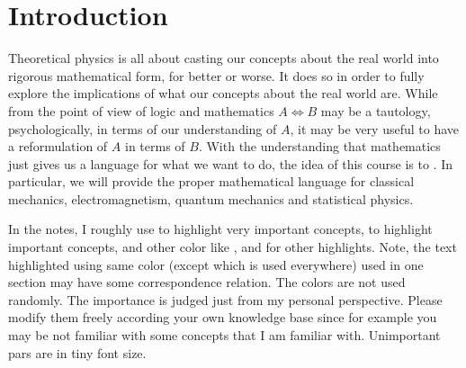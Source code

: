 \documentclass{article}
\begin{document}
\section{Introduction}
Theoretical physics is all about casting our concepts about the real world into rigorous mathematical form, for better or worse. 
It does so in order to fully explore the implications of what our concepts about the real world are. While from the point of view of logic and mathematics $A\Leftrightarrow B$ may be a tautology, psychologically, in terms of our understanding of $A$, it may be very useful to have a reformulation of $A$ in terms of $B$. With the understanding that mathematics just gives us a language for what we want to do, the idea of this course is to . In particular, we will provide the proper mathematical language for classical mechanics, electromagnetism, quantum mechanics and statistical physics.

In the notes,  I roughly use  to highlight very important concepts,  to highlight important concepts, and other color like ,  and  for other highlights. Note, the text highlighted using same color (except  which is used everywhere) used in one section may have some correspondence relation. The colors are not used randomly. The importance is judged just from my personal perspective. Please modify them freely according your own knowledge base since for example you may be not familiar with some concepts that I am familiar with. Unimportant pars are in tiny font size. 
\end{document}
